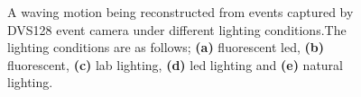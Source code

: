 \begin{figure}[htb]%
    \centering
    \qquad
    \qquad
    \qquad
    \qquad
    \caption{A waving motion being reconstructed from events captured by DVS128 event camera under different lighting conditions.The lighting conditions are as follows; \textbf{(a)} fluorescent led, \textbf{(b)} fluorescent, \textbf{(c)} lab lighting, \textbf{(d)} led lighting and \textbf{(e)} natural lighting.}%
    \label{fig:wave_in_lightings_reconstructions}%
\end{figure}

